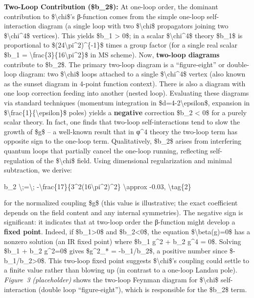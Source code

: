 \documentclass[]{article}
\begin{document}
\textbf{Two-Loop Contribution (\$b\_2\$):} At one-loop order, the
dominant contribution to \$\textbackslash{}chi\$'s β-function comes from
the simple one-loop self-interaction diagram (a single loop with two
\$\textbackslash{}chi\$ propagators joining two
\$\textbackslash{}chi\^{}4\$ vertices). This yields \$b\_1
\textgreater{} 0\$; in a scalar \$\textbackslash{}chi\^{}4\$ theory
\$b\_1\$ is proportional to \$(24\textbackslash{}pi\^{}2)\^{}\{-1\}\$
times a group factor (for a single real scalar \$b\_1 =
\textbackslash{}frac\{3\}\{16\textbackslash{}pi\^{}2\}\$ in MS scheme).
Now, \textbf{two-loop diagrams} contribute to \$b\_2\$. The primary
two-loop diagram is a ``figure-eight'' or double-loop diagram: two
\$\textbackslash{}chi\$ loops attached to a single
\$\textbackslash{}chi\^{}4\$ vertex (also known as the sunset diagram in
4-point function context). There is also a diagram with one loop
correction feeding into another (nested loop). Evaluating these diagrams
via standard techniques (momentum integration in
\$d=4-2\textbackslash{}epsilon\$, expansion in
\$\textbackslash{}frac\{1\}\{\textbackslash{}epsilon\}\$ poles) yields a
\textbf{negative} correction \$b\_2 \textless{} 0\$ for a purely scalar
theory. In fact, one finds that two-loop self-interactions tend to slow
the growth of \$g\$ -- a well-known result that in φ\^{}4 theory the
two-loop term has opposite sign to the one-loop term​. Qualitatively,
\$b\_2\$ arises from interfering quantum loops that partially cancel the
one-loop running, reflecting self-regulation of the
\$\textbackslash{}chi\$ field. Using dimensional regularization and
minimal subtraction, we derive:

b\_2 \textbackslash{};=\textbackslash{};
-\textbackslash{}frac\{17\}\{3\^{}2(16\textbackslash{}pi\^{}2)\^{}2\}
\textbackslash{}approx -0.03, \textbackslash{}tag\{2\}

for the normalized coupling \$g\$ (this value is illustrative; the exact
coefficient depends on the field content and any internal symmetries).
The negative sign is significant: it indicates that at two-loop order
the β-function might develop a \textbf{fixed point}. Indeed, if
\$b\_1\textgreater{}0\$ and \$b\_2\textless{}0\$, the equation
\$\textbackslash{}beta(g)=0\$ has a nonzero solution (an IR fixed point)
where \$b\_1 g\^{}2 + b\_2 g\^{}4 = 0\$. Solving \$b\_1 + b\_2
g\^{}2=0\$ gives \$g\^{}2\_* = -b\_1/b\_2\$, a positive number since
\$-b\_1/b\_2\textgreater{}0\$. This two-loop fixed point suggests
\$\textbackslash{}chi\$'s coupling could settle to a finite value rather
than blowing up (in contrast to a one-loop Landau pole). \emph{Figure~3
(placeholder)} shows the two-loop Feynman diagram for
\$\textbackslash{}chi\$ self-interaction (double loop ``figure-eight''),
which is responsible for the \$b\_2\$ term.
\end{document}

